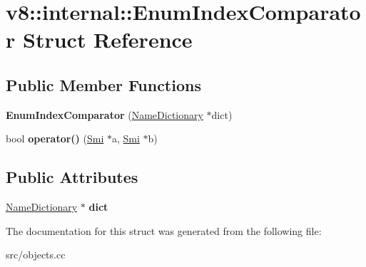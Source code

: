 \hypertarget{structv8_1_1internal_1_1_enum_index_comparator}{}\section{v8\+:\+:internal\+:\+:Enum\+Index\+Comparator Struct Reference}
\label{structv8_1_1internal_1_1_enum_index_comparator}
\subsection*{Public Member Functions}
\begin{DoxyCompactItemize}
\item 
\hypertarget{structv8_1_1internal_1_1_enum_index_comparator_ac30a048389498f7927d92a6bcc1b2d97}{}{\bfseries Enum\+Index\+Comparator} (\hyperlink{classv8_1_1internal_1_1_name_dictionary}{Name\+Dictionary} $\ast$dict)\label{structv8_1_1internal_1_1_enum_index_comparator_ac30a048389498f7927d92a6bcc1b2d97}

\item 
\hypertarget{structv8_1_1internal_1_1_enum_index_comparator_a5c4e448648c04dddaf0384d92f014812}{}bool {\bfseries operator()} (\hyperlink{classv8_1_1internal_1_1_smi}{Smi} $\ast$a, \hyperlink{classv8_1_1internal_1_1_smi}{Smi} $\ast$b)\label{structv8_1_1internal_1_1_enum_index_comparator_a5c4e448648c04dddaf0384d92f014812}

\end{DoxyCompactItemize}
\subsection*{Public Attributes}
\begin{DoxyCompactItemize}
\item 
\hypertarget{structv8_1_1internal_1_1_enum_index_comparator_ac550209ffc012a81e62ffc6cc14b9a2b}{}\hyperlink{classv8_1_1internal_1_1_name_dictionary}{Name\+Dictionary} $\ast$ {\bfseries dict}\label{structv8_1_1internal_1_1_enum_index_comparator_ac550209ffc012a81e62ffc6cc14b9a2b}

\end{DoxyCompactItemize}


The documentation for this struct was generated from the following file\+:\begin{DoxyCompactItemize}
\item 
src/objects.\+cc\end{DoxyCompactItemize}
